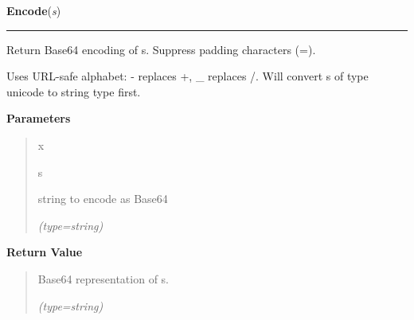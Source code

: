     \label{keyczar:util:Encode}

    \vspace{0.5ex}

\hspace{.8\funcindent}\begin{boxedminipage}{\funcwidth}

    \raggedright \textbf{Encode}(\textit{s})

    \vspace{-1.5ex}

    \rule{\textwidth}{0.5\fboxrule}
\setlength{\parskip}{2ex}
    Return Base64 encoding of s. Suppress padding characters (=).

    Uses URL-safe alphabet: - replaces +, \_ replaces /. Will convert s of 
    type unicode to string type first.

\setlength{\parskip}{1ex}
      \textbf{Parameters}
      \vspace{-1ex}

      \begin{quote}
        \begin{Ventry}{x}

          \item[s]

          string to encode as Base64

            {\it (type=string)}

        \end{Ventry}

      \end{quote}

      \textbf{Return Value}
    \vspace{-1ex}

      \begin{quote}
      Base64 representation of s.

      {\it (type=string)}

      \end{quote}

    \end{boxedminipage}

    \label{keyczar:util:Decode}

    \vspace{0.5ex}

